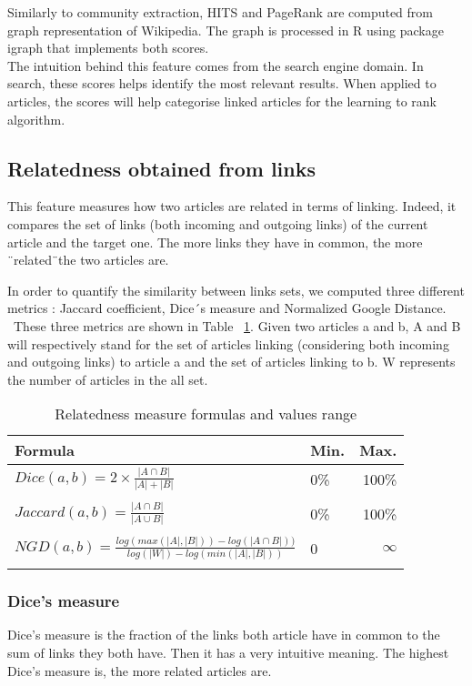 Similarly to community extraction, HITS and PageRank are computed from graph representation of Wikipedia. The graph is processed in R using package igraph that implements both scores. \\

The intuition behind this feature comes from the search engine domain. In search, these scores helps identify the most relevant results. When applied to articles, the scores will help categorise linked articles for the learning to rank algorithm.

\subsection{Relatedness obtained from links}

This feature measures how two articles are related in terms of linking. Indeed, it compares the set of links (both incoming and outgoing links) of the current article and the target one. The more links they have in common, the more \"\ related\"\ the two articles are. \

In order to quantify the similarity between links sets, we computed three different metrics  : Jaccard coefficient, Dice\'\ s measure and Normalized Google Distance. \
These three metrics are shown in Table ~\ref{fig:formulas}. Given two articles a and b, A and B will respectively stand for the set of articles linking (considering both incoming and outgoing links) to article a and the set of articles linking to b. W represents the number of articles in the all set.

\begin{table}[H]
\caption{Relatedness measure formulas and values range}
\centering
\begin{tabular}{llr}
\toprule
\cmidrule(r){1-2}
Formula & Min. & Max.\\
\midrule
$Dice(a,b)=2\times\frac{|A \cap B|}{|A| + |B|}$ & 0\% & 100\% \\
 & & \\
$Jaccard(a,b)= \frac{|A\cap B|}{|A\cup B|}$ & 0\% & 100\% \\
 & & \\
$NGD(a,b)= \frac{log(max(|A|,|B|))-log(|A\cap B|))}{log(|W|)-log(min(|A|,|B|))}$ & 0 & $\infty $ \\
\bottomrule
\label{fig:formulas}
\end{tabular}
\end{table}

\subsubsection*{Dice's measure}
Dice's measure is the fraction of the links both article have in common to the sum of links they both have. Then it has a very intuitive meaning. The highest Dice's measure is, the more related articles are.\

